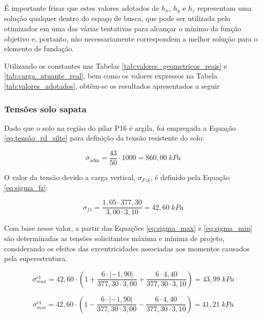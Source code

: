 É importante frisar que estes valores adotados de $h_x$, $h_y$ e $h_z$ representam uma solução qualquer dentro do espaço de busca, que pode ser utilizada pelo otimizador em uma das várias tentativas para alcançar o mínimo da função objetivo e, portanto, não necessariamente correspondem a melhor solução para o elemento de fundação.

Utilizando os constantes nas Tabelas \ref{tab:valores_geometricos_reais} e \ref{tab:carga_atuante_real}, bem como os valores expressos na Tabela \ref{tab:valores_adotados}, obtêm-se os resultados apresentados a seguir

\subsubsection{Tensões solo sapata}

Dado que o solo na região do pilar P16 é argila, foi empregada a Equação \eqref{eq:tensão_rd_silte} para definição da tensão resistente do solo:

\begin{equation}
\sigma_{\text{adm}} = \frac{ 43}{50} \cdot 1000 = 860,00\;kPa
\label{eq:EL16_tensão_rd_silte}
\end{equation}

O valor da tensão devido a carga vertical, $\sigma_{Fzk}$, é definido pela Equação \eqref{eq:sigma_fz}:

\begin{equation}
    \sigma_{fz} = \frac{1,05 \cdot 377,30}{3,00 \cdot 3,10} = 42,60 \; kPa
    \label{eq:EL16_sigma_fz}
\end{equation}

Com base nesse valor, a partir das Equações \eqref{eq:sigma_max} e \eqref{eq:sigma_min} são determinadas as tensões solicitantes máxima e mínima de projeto, considerando os efeitos das excentricidades associadas aos momentos causados pela superestrutura.

\begin{equation}
\sigma_{max}^{c1} = 42,60 \cdot \left( 1 + \frac{6 \cdot |-1,90|}{377,30 \cdot 3,00} + \frac{6 \cdot 4,40}{377,30 \cdot 3,10} \right) = 43,99 \; kPa
\label{eq:EL16_sigma_max}
\end{equation}

\begin{equation}
\sigma_{min}^{c1} = 42,60 \cdot \left( 1 - \frac{6 \cdot |-1,90|}{377,30 \cdot 3,00} - \frac{6 \cdot 4,40}{377,30  \cdot 3,10} \right) = 41,21 \; kPa
\label{eq:EL16_sigma_min}
\end{equation}


